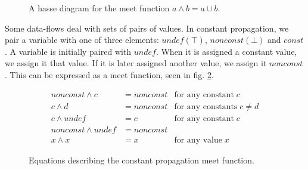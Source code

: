 \documentclass[bsc,twoside,singlespacing,parskip,logo]{infthesis}     %
\begin{document}
        \begin{figure}[ht]
        \centering
        \caption{A hasse diagram for the meet function $a \land b = a \cup b$.}
        \label{meethasse}
        \end{figure}
        
        Some data-flows deal with sets of pairs of values. In constant propagation, we pair a variable with one of three elements: $undef (\top)$, $nonconst (\bot)$ and $const$. A variable is initially paired with $undef$. When it is assigned a constant value, we assign it that value. If it is later assigned another value, we assign it $nonconst$. This can be expressed as a meet function, seen in fig. \ref{constmeet}.
        
        \begin{figure}[!ht]
        \begin{align}
        nonconst \land c &= nonconst & \text{for any constant} \; c \\
        c \land d &= nonconst &\text{for any constants} \; c \neq d \\
        c \land undef &= c &\text{for any constant} \; c \\
        nonconst \land undef &= nonconst & \\
        x \land x &= x &\text{for any value} \; x
        \end{align}
        \caption{Equations describing the constant propagation meet function.}
        \label{constmeet}
        \end{figure}
        
\end{document}
